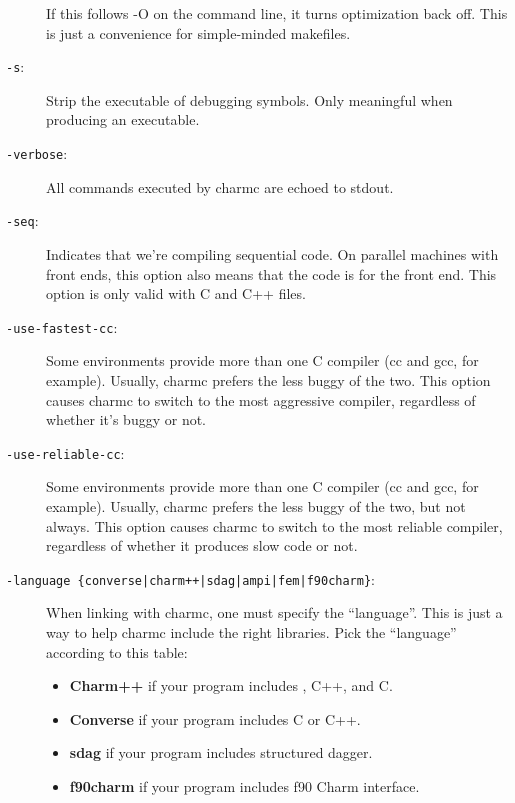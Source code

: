 \begin{description}
If this follows -O on the command line, it turns optimization back off.
This is just a convenience for simple-minded makefiles.

\item[{\tt -s}:]

Strip the executable of debugging symbols.  Only meaningful when
producing an executable.

\item[{\tt -verbose}:]

All commands executed by charmc are echoed to stdout.

\item[{\tt -seq}:]

Indicates that we're compiling sequential code.  On parallel machines
with front ends, this option also means that the code is for the front
end.  This option is only valid with C and C++ files.

\item[{\tt -use-fastest-cc}:]

Some environments provide more than one C compiler (cc and gcc, for
example).  Usually, charmc prefers the less buggy of the two.  This
option causes charmc to switch to the most aggressive compiler,
regardless of whether it's buggy or not.

\item[{\tt -use-reliable-cc}:]

Some environments provide more than one C compiler (cc and gcc, for
example).  Usually, charmc prefers the less buggy of the two, but
not always.  This option causes charmc to switch to the most reliable
compiler, regardless of whether it produces slow code or not.

\item[{\tt -language \{converse|charm++|sdag|ampi|fem|f90charm\}}:]

When linking with charmc, one must specify the ``language''.  This
is just a way to help charmc include the right libraries.  Pick the
``language'' according to this table:

\begin{itemize}
\item{{\bf Charm++} if your program includes \charmpp{}, C++, and C.}
\item{{\bf Converse} if your program includes C or C++.}
\item{{\bf sdag} if your program includes structured dagger.}
\item{{\bf f90charm} if your program includes f90 Charm interface.}
\end{itemize}


\end{description}
